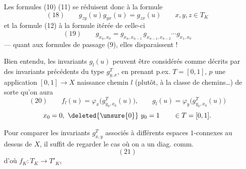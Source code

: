 Les formules (10) (11) se réduisent donc à la formule
\[
(18)\qquad g_{zy}(u)g_{yx}(u)=g_{zx}(u)\qquad x,y,z\in T_K
\]
et la formule (12) à la formule itérée de celle-ci
\[
(19)\qquad g_{x_n,x_0}=g_{x_n,x_{n-1}}\,g_{x_{n-1},x_{n-2}}\cdots g_{x_1,x_0}
\]
--- quant aux formules de passage (9), elles  disparaissent !

Bien entendu, les invariants $g_l(u)$  peuvent être considérés comme décrits par des invariants précédents du type $g_{y,x}^T$, en prenant  p.ex. $T=[0,1]$, $p$ une application $[0,1]\longrightarrow X$  naissance  chemin $l$ (plutôt, à la classe de chemins\ldots) de sorte qu'on aura
\[
(20)\qquad f_l(u)=\varphi_x\bigl(g_{y_0,x_0}^T(u)\bigr),\qquad g_l(u)=\varphi_y\bigl(g_{y_0,x_0}^T(u)\bigr)
\]
\[
x_0=0,\ \deleted{\unsure{0}}\ y_0=1\qquad\in T=[0,1].
\]

Pour comparer les invariants $g_{x,y}^T$ associés à différents espaces $1$-connexes au dessus de $X$, il suffit de regarder le cas où on a un diag. comm.
\[
(21)
\]
d'où $f_K:T_K\longrightarrow T'_K$,

